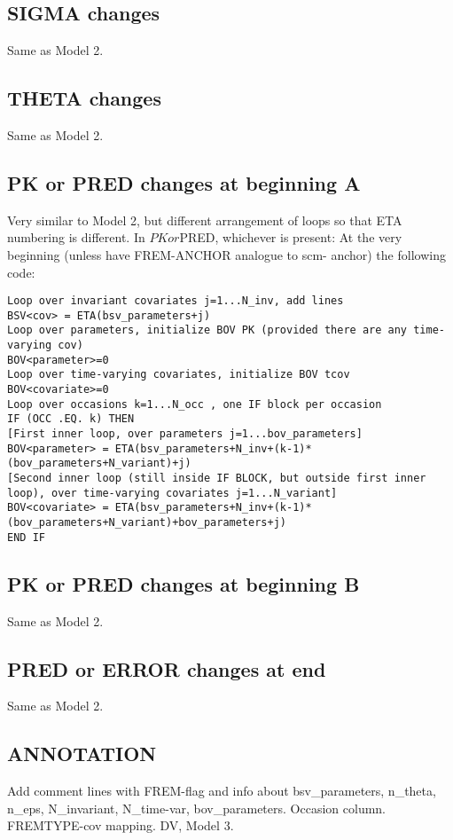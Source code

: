 \documentclass[a4paper,12pt]{article}
\begin{document}
\subsection{SIGMA changes}
Same as Model 2.

\subsection{THETA changes}
Same as Model 2.

\subsection{PK or PRED changes at beginning A}
Very similar to Model 2, but different arrangement of loops so that ETA numbering is different.
In $PK or $PRED, whichever is present:
At the very beginning (unless have FREM-ANCHOR analogue to scm- anchor) the following code: 
\begin{verbatim}
Loop over invariant covariates j=1...N_inv, add lines
BSV<cov> = ETA(bsv_parameters+j)
Loop over parameters, initialize BOV PK (provided there are any time-varying cov)
BOV<parameter>=0
Loop over time-varying covariates, initialize BOV tcov
BOV<covariate>=0
Loop over occasions k=1...N_occ , one IF block per occasion
IF (OCC .EQ. k) THEN
[First inner loop, over parameters j=1...bov_parameters]
BOV<parameter> = ETA(bsv_parameters+N_inv+(k-1)*(bov_parameters+N_variant)+j)
[Second inner loop (still inside IF BLOCK, but outside first inner loop), over time-varying covariates j=1...N_variant]
BOV<covariate> = ETA(bsv_parameters+N_inv+(k-1)*(bov_parameters+N_variant)+bov_parameters+j)
END IF
\end{verbatim}

\subsection{PK or PRED changes at beginning B}
Same as Model 2.

\subsection{PRED or ERROR changes at end}
Same as Model 2.

\subsection{ANNOTATION}
Add comment lines with FREM-flag and info about bsv\_parameters, n\_theta, n\_eps, N\_invariant, N\_time-var, bov\_parameters. Occasion column. FREMTYPE-cov mapping. DV, Model 3.
\end{document}
